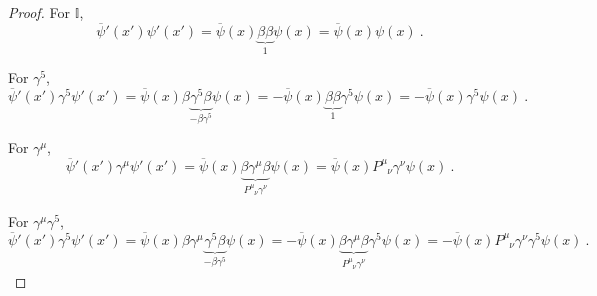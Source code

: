     \begin{proof}
        For $\mathbb I$, 
        \begin{equation*}
            \overline \psi' (x') \psi' (x') = \overline \psi (x) \underbrace{\beta \beta}_1 \psi (x) = \overline \psi (x) \psi (x)  ~.
        \end{equation*}

        For $\gamma^5$, 
        \begin{equation*}
            \overline \psi' (x') \gamma^5 \psi' (x') = \overline \psi (x) \beta \underbrace{\gamma^5 \beta}_{-\beta \gamma^5} \psi (x) = - \overline \psi (x) \underbrace{\beta \beta}_1 \gamma^5 \psi (x) = - \overline \psi (x) \gamma^5 \psi (x)~.
        \end{equation*}

        For $\gamma^\mu$, 
        \begin{equation*}
            \overline \psi' (x') \gamma^\mu \psi' (x') = \overline \psi (x) \underbrace{\beta \gamma^\mu \beta }_{P^\mu_{\phantom \mu \nu} \gamma^\nu} \psi (x) = \overline \psi (x) P^\mu_{\phantom \mu \nu} \gamma^\nu \psi (x) ~.
        \end{equation*}

        For $\gamma^\mu \gamma^5$, 
        \begin{equation*}
            \overline \psi' (x') \gamma^5 \psi' (x') = \overline \psi (x) \beta \gamma^\mu \underbrace{\gamma^5 \beta}_{-\beta \gamma^5} \psi (x) = - \overline \psi (x) \underbrace{\beta \gamma^\mu \beta }_{P^\mu_{\phantom \mu \nu} \gamma^\nu} \gamma^5 \psi (x) = - \overline \psi (x) P^\mu_{\phantom \mu \nu} \gamma^\nu \gamma^5 \psi (x)  ~.
        \end{equation*}
        

\end{proof}
